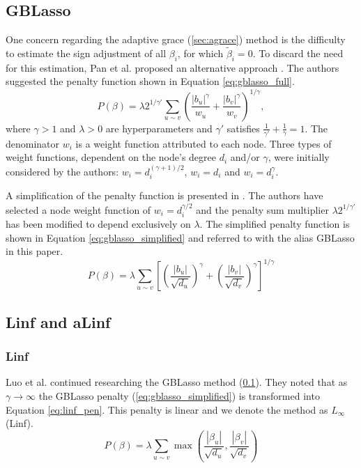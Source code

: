 \subsection{GBLasso} \label{sec:gblasso}
One concern regarding the adaptive grace (\ref{sec:agrace}) method is the difficulty to estimate the sign adjustment of all $\beta_i$, for which $\tilde{\beta}_i = 0$. To discard the need for this estimation, Pan et al. proposed an alternative approach \cite{pan2010incorporating}. The authors suggested the penalty function shown in Equation \ref{eq:gblasso_full}. 
\begin{equation} \label{eq:gblasso_full}
P(\beta) = \lambda 2^{1/\gamma'}\sum_{u \sim v}\left(\frac{|b_u|^\gamma}{w_u}+\frac{|b_v|^\gamma}{w_v}\right)^{1/\gamma},
\end{equation}
where $\gamma > 1$ and $\lambda > 0$ are hyperparameters and $\gamma'$ satisfies $\frac{1}{\gamma'}+\frac{1}{\gamma}=1$. The denominator $w_i$ is a weight function attributed to each node. Three types of weight functions, dependent on the node's degree $d_i$ and/or $\gamma$, were initially considered by the authors: $w_i = d_i^{(\gamma+1)/2}$, $w_i = d_i$ and $w_i = d_i^\gamma$. 

A simplification of the penalty function is presented in \cite{luo2012two}. The authors have selected a node weight function of $w_i = d_i^{\gamma/2}$ and the penalty sum multiplier $\lambda2^{1/\gamma'}$ has been modified to depend exclusively on $\lambda$. The simplified penalty function is shown in Equation \ref{eq:gblasso_simplified} and referred to with the alias GBLasso in this paper.
\begin{equation} \label{eq:gblasso_simplified}
P(\beta) = \lambda\sum_{u \sim v}
\left[\left(\frac{|b_u|}{\sqrt{d_u}}\right)^\gamma+
\left(\frac{|b_v|}{\sqrt{d_v}}\right)^\gamma\right]^{1/\gamma}
\end{equation}



\subsection{Linf and aLinf}

\subsubsection{Linf} \label{sec:linf}
Luo et al. \cite{luo2012two} continued researching the GBLasso method (\ref{sec:gblasso}). They noted that as $\gamma\rightarrow\infty$ the GBLasso penalty (\ref{eq:gblasso_simplified}) is transformed into Equation \ref{eq:linf_pen}. This penalty is linear and we denote the method as $L_\infty$ (Linf). 
\begin{equation} \label{eq:linf_pen}
P(\beta) = \lambda\sum_{u \sim v}\max\left(\frac{|\beta_u|}{\sqrt{d_u}},\frac{|\beta_v|}{\sqrt{d_v}}\right)
\end{equation}


